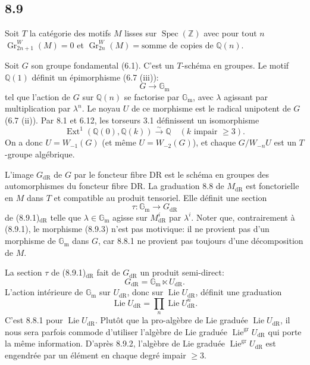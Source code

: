 \documentclass[12pt,a4paper]{article}
\theoremstyle{plain}
\theoremstyle{definition}
\theoremstyle{remark}
\DeclareMathOperator{\Spec}{Spec}
\DeclareMathOperator{\Ext}{Ext}
\DeclareMathOperator{\Lie}{Lie}
\DeclareMathOperator{\Gr}{Gr}
\newcommand{\gr}{\mathrm{gr}}
\newcommand{\DR}{\mathrm{dR}}
\newcommand{\Z}{\mathbb{Z}}
\newcommand{\Q}{\mathbb{Q}}
\newcommand{\Gm}{\mathbb{G}_\mathrm{m}}
\begin{document}
\subsection*{8.9}
Soit $T$ la cat\'egorie des motifs $M$ lisses sur $\Spec(\Z)$ avec pour tout $n$ $\Gr^W_{2n+1}(M) = 0$ et $\Gr^W_{2n}(M) = \text{somme de copies de } \Q(n)$.

Soit $G$ son groupe fondamental (6.1). C'est un $T$-sch\'ema en groupes. Le motif $\Q(1)$ d\'efinit un \'epimorphisme (6.7 (iii)):
\begin{equation*}\tag{8.9.1}
G \longrightarrow \Gm
\end{equation*}
tel que l'action de $G$ sur $\Q(n)$ se factorise par $\Gm$, avec $\lambda$ agissant par multiplication par $\lambda^n$. Le noyau $U$ de ce morphisme est le radical unipotent de $G$ (6.7 (ii)). Par 8.1 et 6.12, les torseurs 3.1 d\'efinissent un isomorphisme
\begin{equation*}\tag{8.9.2}
\Ext^1(\Q(0), \Q(k)) \xrightarrow{\sim} \Q \quad (k \text{ impair } \geq 3).
\end{equation*}
On a donc $U = W_{-1}(G)$ (et m\^eme $U = W_{-2}(G)$), et chaque $G/W_{-n}U$ est un $T$-groupe alg\'ebrique.

L'image $G_\DR$ de $G$ par le foncteur fibre DR est le sch\'ema en groupes des automorphismes du foncteur fibre DR. La graduation 8.8 de $M_\DR$ est fonctorielle en $M$ dans $T$ et compatible au produit tensoriel. Elle d\'efinit une section
\begin{equation*}\tag{8.9.3}
\tau: \Gm \longrightarrow G_\DR
\end{equation*}
de (8.9.1)$_\DR$ telle que $\lambda \in \Gm$ agisse sur $M_\DR^i$ par $\lambda^i$. Noter que, contrairement \`a (8.9.1), le morphisme (8.9.3) n'est pas motivique: il ne provient pas d'un morphisme de $\Gm$ dans $G$, car 8.8.1 ne provient pas toujours d'une d\'ecomposition de $M$.

La section $\tau$ de (8.9.1)$_\DR$ fait de $G_\DR$ un produit semi-direct:
\begin{equation*}\tag{8.9.4}
G_\DR = \Gm \ltimes U_\DR.
\end{equation*}
L'action int\'erieure de $\Gm$ sur $U_\DR$, donc sur $\Lie U_\DR$, d\'efinit une graduation
\[
\Lie U_\DR = \prod_n \Lie U_\DR^n.
\]
C'est 8.8.1 pour $\Lie U_\DR$. Plut\^ot que la pro-alg\`ebre de Lie gradu\'ee $\Lie U_\DR$, il nous sera parfois commode d'utiliser l'alg\`ebre de Lie gradu\'ee $\Lie^\gr U_\DR$ qui porte la m\^eme information. D'apr\`es 8.9.2, l'alg\`ebre de Lie gradu\'ee $\Lie^\gr U_\DR$ est engendr\'ee par un \'el\'ement en chaque degr\'e impair $\geq 3$.
\end{document}
